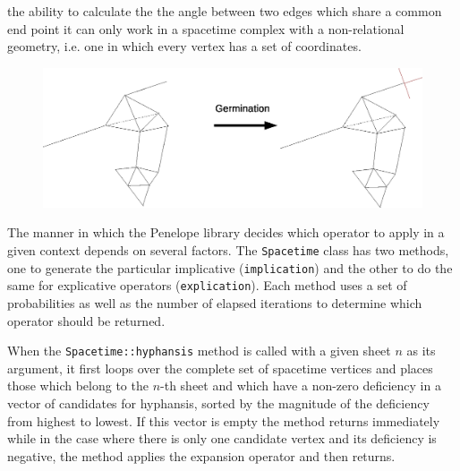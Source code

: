 \documentclass[12pt,letterpaper]{report}
\begin{document}
the ability to calculate the the angle between two edges which share a common end point it can only work 
in a spacetime complex with a non-relational geometry, i.e. one in which every vertex has a set of 
coordinates. 
\begin{figure}[htp]
\centering
\label{expl_final2}
\includegraphics[width=5in]{images/germination.eps} 
\end{figure}
 
The manner in which the Penelope library decides which operator to apply in a given context depends on 
several factors. The \texttt{Spacetime} class has two methods, one to generate the particular implicative 
(\texttt{implication}) and the other to do the same for explicative operators (\texttt{explication}). Each 
method uses a set of probabilities as well as the number of elapsed iterations to determine which 
operator should be returned. 

When the \texttt{Spacetime::hyphansis} method is called with a given sheet $n$ as its argument, it first 
loops over the complete set of spacetime vertices and places those which belong to the $n$-th sheet
and which have a non-zero deficiency in a vector of candidates for hyphansis, sorted by the magnitude of 
the deficiency from highest to lowest. If this vector is empty the method returns immediately while in the 
case where there is only one candidate vertex and its deficiency is negative, the method applies the 
expansion operator and then returns.
\end{document}
